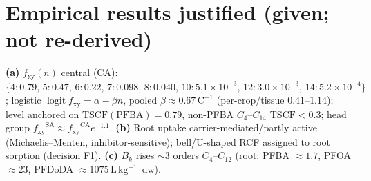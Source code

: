 \documentclass[11pt]{article}
\newcommand{\fxy}{\ensuremath{f_{\mathrm{xy}}}}
\newcommand{\Bk}{\ensuremath{B_{k}}}
\newcommand{\TSCF}{\ensuremath{\mathrm{TSCF}}}
\newcommand{\Lkg}{\ensuremath{\,\mathrm{L\,kg^{-1}}}}
\begin{document}
\section{Empirical results justified (given; not re-derived)}\label{sec:emp}
\textbf{(a)} $\fxy(n)$ central (CA): $\{4{:}0.79,\,5{:}0.47,\,6{:}0.22,\,7{:}0.098,\,8{:}0.040,\,
10{:}5.1\!\times\!10^{-3},\,12{:}3.0\!\times\!10^{-3},\,14{:}5.2\!\times\!10^{-4}\}$;
logistic $\operatorname{logit}\fxy=\alpha-\beta n$, pooled $\beta\approx0.67\,\mathrm{C^{-1}}$
(per-crop/tissue $0.41$--$1.14$); level anchored on $\TSCF(\mathrm{PFBA})=0.79$, non-PFBA $C_4$--$C_{14}$
$\TSCF<0.3$; head group $\fxy^{\mathrm{SA}}\approx\fxy^{\mathrm{CA}}e^{-1.1}$.
\textbf{(b)} Root uptake carrier-mediated/partly active (Michaelis--Menten, inhibitor-sensitive);
bell/U-shaped RCF assigned to root sorption (decision F1).
\textbf{(c)} $\Bk$ rises $\sim\!3$ orders $C_4$--$C_{12}$ (root: PFBA $\approx1.7$, PFOA $\approx23$,
PFDoDA $\approx1075\Lkg$~dw).

\end{document}
